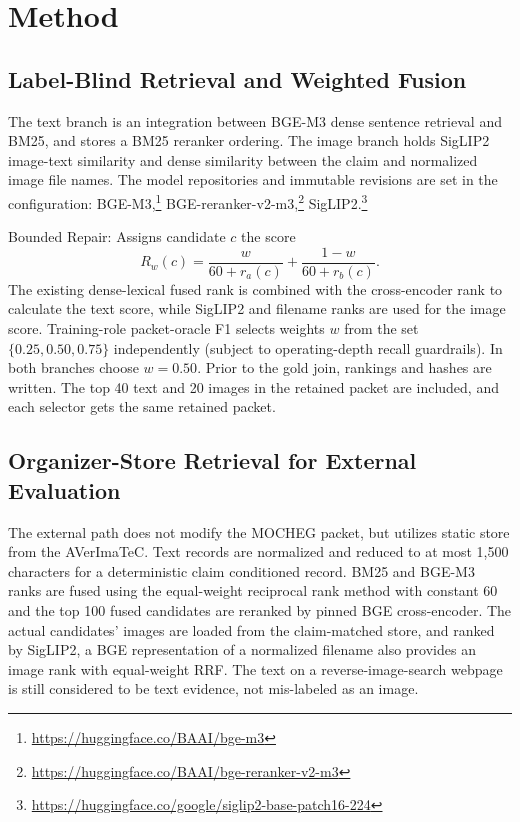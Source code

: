 \section{Method}
\label{sec:method}

\subsection{Label-Blind Retrieval and Weighted Fusion}

The text branch is an integration between BGE-M3 dense sentence retrieval and BM25, and stores a BM25 reranker ordering. The image branch holds SigLIP2 image-text similarity and dense similarity between the claim and normalized image file names. The model repositories and immutable revisions are set in the configuration: BGE-M3,\footnote{\url{https://huggingface.co/BAAI/bge-m3}} BGE-reranker-v2-m3,\footnote{\url{https://huggingface.co/BAAI/bge-reranker-v2-m3}} SigLIP2.\footnote{\url{https://huggingface.co/google/siglip2-base-patch16-224}}

Bounded Repair: Assigns candidate $c$ the score
\begin{equation}
R_w(c)=\frac{w}{60+r_a(c)}+\frac{1-w}{60+r_b(c)}.
\label{eq:weighted-rank-fusion}
\end{equation}
The existing dense-lexical fused rank is combined with the cross-encoder rank to calculate the text score, while SigLIP2 and filename ranks are used for the image score. Training-role packet-oracle F1 selects weights $w$ from the set $\{0.25,0.50,0.75\}$ independently (subject to operating-depth recall guardrails). In both branches choose $w = 0.50$. Prior to the gold join, rankings and hashes are written. The top 40 text and 20 images in the retained packet are included, and each selector gets the same retained packet.

\subsection{Organizer-Store Retrieval for External Evaluation}

The external path does not modify the MOCHEG packet, but utilizes static store from the AVerImaTeC. Text records are normalized and reduced to at most 1,500 characters for a deterministic claim conditioned record. BM25 and BGE-M3 ranks are fused using the equal-weight reciprocal rank method with constant 60 and the top 100 fused candidates are reranked by pinned BGE cross-encoder. The actual candidates' images are loaded from the claim-matched store, and ranked by SigLIP2, a BGE representation of a normalized filename also provides an image rank with equal-weight RRF. The text on a reverse-image-search webpage is still considered to be text evidence, not mis-labeled as an image.

